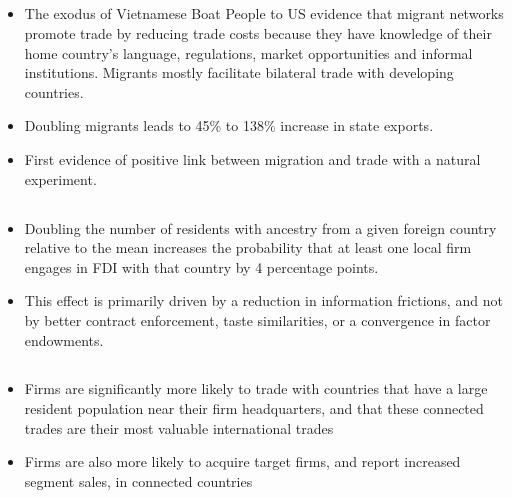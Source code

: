 \documentclass[10pt]{article} %
\begin{document}
    \subsection{\cite{ParsonsVezina2018}}
    \begin{itemize}
        \item The exodus of Vietnamese Boat People to US evidence that migrant networks promote trade by reducing trade costs because they have knowledge of their home country's language, regulations, market opportunities and informal institutions. Migrants mostly facilitate bilateral trade with developing countries.
        \item Doubling migrants leads to 45\% to 138\% increase in state exports.
        \item First evidence of positive link between migration and trade with a natural experiment.
    \end{itemize}

    \subsection{\cite{BurchardiChaneyHassan2019}}
    \begin{itemize}
        \item Doubling the number of residents with ancestry from a given foreign country relative to the mean increases the probability that at least one local firm engages in FDI with that country by 4 percentage points.
        \item This effect is primarily driven by a reduction in information frictions, and not by better contract enforcement, taste similarities, or a convergence in factor endowments.
    \end{itemize}

    \subsection{\cite{CohenGurunMalloy2017}}
    \begin{itemize}
        \item Firms are significantly more likely to trade with countries that have a large resident population near their firm headquarters, and that these connected trades are their most valuable international trades
        \item Firms are also more likely to acquire target firms, and report increased segment sales, in connected countries
    \end{itemize}
\end{document}
